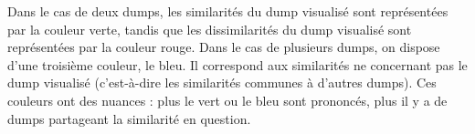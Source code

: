 Dans le cas de deux dumps, les similarités du dump visualisé sont représentées par la couleur verte, tandis que les dissimilarités du dump visualisé sont représentées par la couleur rouge.
Dans le cas de plusieurs dumps, on dispose d'une troisième couleur, le bleu. Il correspond aux similarités ne concernant pas le dump visualisé (c'est-à-dire les similarités communes à d'autres dumps).
Ces couleurs ont des nuances : plus le vert ou le bleu sont prononcés, plus il y a de dumps partageant la similarité en question.
